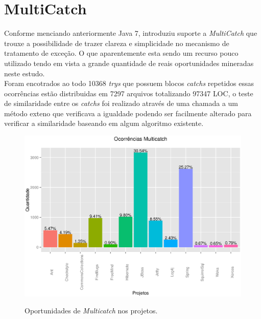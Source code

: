 \section{MultiCatch}
Conforme menciando anteriormente Java 7, introduziu suporte a \textit{MultiCatch} que trouxe a possibilidade de trazer clareza e simplicidade no mecanismo de tratamento de exceção. O que aparentemente esta sendo um recurso pouco utilizado tendo em vista a grande quantidade de reais  oportunidades mineradas neste estudo.\\

Foram encotrados ao todo 10368 \textit{trys} que possuem blocos \textit{catchs} repetidos essas ocorrências estão distribuidas em 7297 arquivos totalizando 97347 \acs{LOC}, o teste de  similaridade entre os \textit{catchs} foi realizado através de uma chamada a um método exteno que verificava a igualdade podendo ser facilmente alterado para verificar a similaridade baseando em algum algoritmo existente.\\


\begin{figure}[h]
	\center
	\includegraphics[scale=0.8]{Imagens/ocorrenciasMulticatch}
	\label{fig:Muticatch}
	\caption{Oportunidades de \textit{Multicatch} nos projetos.}
\end{figure}
		


